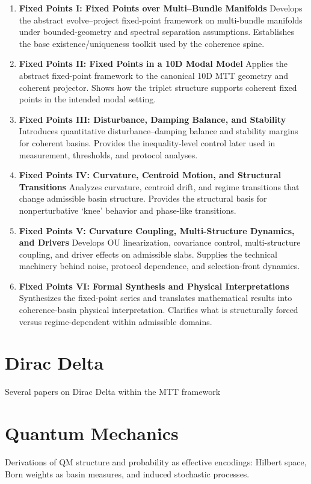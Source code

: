 \documentclass[11pt]{article}
\begin{document}
\begin{enumerate}[leftmargin=*]
\item \textbf{Fixed Points I: Fixed Points over Multi–Bundle Manifolds} Develops the abstract evolve–project fixed-point framework on multi-bundle manifolds under bounded-geometry and spectral separation assumptions. Establishes the base existence/uniqueness toolkit used by the coherence spine.
\item \textbf{Fixed Points II: Fixed Points in a 10D Modal Model} Applies the abstract fixed-point framework to the canonical 10D MTT geometry and coherent projector. Shows how the triplet structure supports coherent fixed points in the intended modal setting.
\item \textbf{Fixed Points III: Disturbance, Damping Balance, and Stability} Introduces quantitative disturbance–damping balance and stability margins for coherent basins. Provides the inequality-level control later used in measurement, thresholds, and protocol analyses.
\item \textbf{Fixed Points IV: Curvature, Centroid Motion, and Structural Transitions} Analyzes curvature, centroid drift, and regime transitions that change admissible basin structure. Provides the structural basis for nonperturbative ‘knee’ behavior and phase-like transitions.
\item \textbf{Fixed Points V: Curvature Coupling, Multi-Structure Dynamics, and Drivers} Develops OU linearization, covariance control, multi-structure coupling, and driver effects on admissible slabs. Supplies the technical machinery behind noise, protocol dependence, and selection-front dynamics.
\item \textbf{Fixed Points VI: Formal Synthesis and Physical Interpretations} Synthesizes the fixed-point series and translates mathematical results into coherence-basin physical interpretation. Clarifies what is structurally forced versus regime-dependent within admissible domains.
\end{enumerate}

\section{Dirac Delta}
Several papers on Dirac Delta within the MTT framework


\section{Quantum Mechanics}
Derivations of QM structure and probability as effective encodings: Hilbert space, Born weights as basin measures, and induced stochastic processes.
\end{document}
